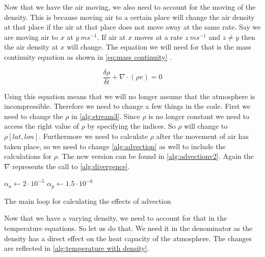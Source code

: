 Now that we have the air moving, we also need to account for the moving of the density. This is because moving air to a certain place will change the air density at that place if the air at that 
place does not move away at the same rate. Say we are moving air to $x$ at $y \ ms^{-1}$. If air at $x$ moves at a rate $z \ ms^{-1}$ and $z \neq y$ then the air density at $x$ will change.
The equation we will need for that is the mass continuity equation as shown in \autoref{eq:mass continuity} \cite{masscontinue}.

\begin{equation}
    \frac{\delta \rho}{\delta t} + \nabla \cdot (\rho v) = 0
    \label{eq:mass continuity}
\end{equation}

Using this equation means that we will no longer assume that the atmosphere is incompressible. Therefore we need to change a few things in the code. First we need to change the $\rho$ in 
\autoref{alg:stream3}. Since $\rho$ is no longer constant we need to access the right value of $\rho$ by specifying the indices. So $\rho$ will change to $\rho[lat, lon]$. Furthermore we need
to calculate $\rho$ after the movement of air has taken place, so we need to change \autoref{alg:advection} as well to include the calculations for $\rho$. The new version can be found in 
\autoref{alg:advectionv2}. Again the $\nabla$ represents the call to \autoref{alg:divergence}.


\begin{algorithm}
    $\alpha_a \leftarrow 2 \cdot 10^{-5}$ \;
    $\alpha_p \leftarrow 1.5 \cdot 10^{-6}$ \;
    \caption{The main loop for calculating the effects of advection}
    \label{alg:advectionv2}
\end{algorithm}

Now that we have a varying density, we need to account for that in the temperature equations. So let us do that. We need it in the denominator as the density has a direct effect on the 
heat capacity of the atmosphere. The changes are reflected in \autoref{alg:temperature with density}.

